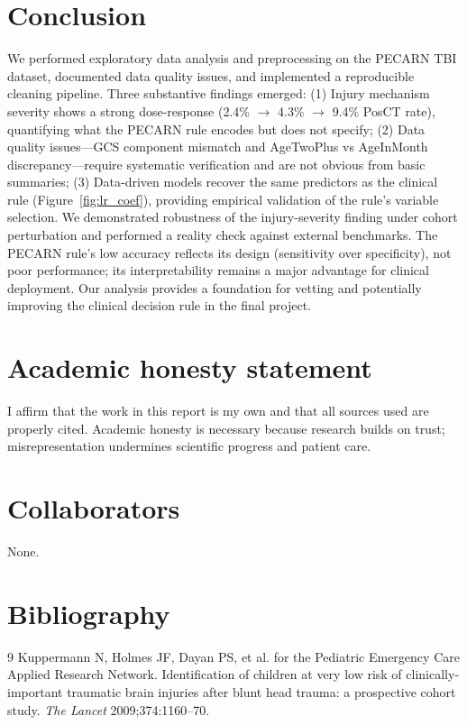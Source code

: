 \documentclass[10pt,letterpaper]{article}
\begin{document}
\section{Conclusion}\label{conclusion}

We performed exploratory data analysis and preprocessing on the PECARN TBI dataset, documented data quality issues, and implemented a reproducible cleaning pipeline. Three substantive findings emerged: (1) Injury mechanism severity shows a strong dose-response (2.4\% $\to$ 4.3\% $\to$ 9.4\% PosCT rate), quantifying what the PECARN rule encodes but does not specify; (2) Data quality issues---GCS component mismatch and AgeTwoPlus vs AgeInMonth discrepancy---require systematic verification and are not obvious from basic summaries; (3) Data-driven models recover the same predictors as the clinical rule (Figure~\ref{fig:lr_coef}), providing empirical validation of the rule's variable selection. We demonstrated robustness of the injury-severity finding under cohort perturbation and performed a reality check against external benchmarks. The PECARN rule's low accuracy reflects its design (sensitivity over specificity), not poor performance; its interpretability remains a major advantage for clinical deployment. Our analysis provides a foundation for vetting and potentially improving the clinical decision rule in the final project.

\section{Academic honesty statement}\label{academic-honesty-statement}

I affirm that the work in this report is my own and that all sources used are properly cited. Academic honesty is necessary because research builds on trust; misrepresentation undermines scientific progress and patient care.

\section{Collaborators}\label{collaborators}

None.

\section{Bibliography}\label{bibliography}

\begin{thebibliography}{9}
Kuppermann N, Holmes JF, Dayan PS, et al. for the Pediatric Emergency Care Applied Research Network.
Identification of children at very low risk of clinically-important traumatic brain injuries after blunt head trauma: a prospective cohort study.
\textit{The Lancet} 2009;374:1160--70.
\end{thebibliography}
\end{document}
